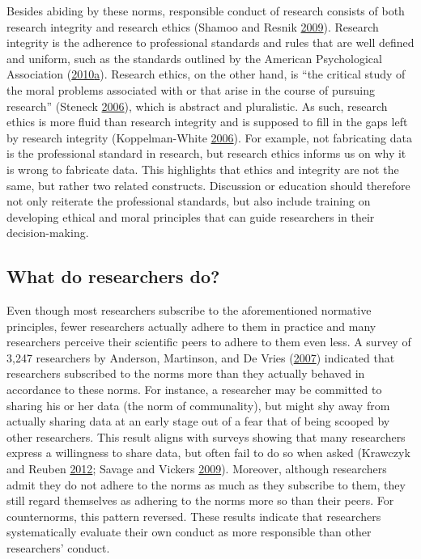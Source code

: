 \documentclass[a5paper]{book}
\begin{document}
Besides abiding by these norms, responsible conduct of research consists
of both research integrity and research ethics (Shamoo and Resnik
\protect\hyperlink{ref-isbn:9780199376025}{2009}). Research integrity is
the adherence to professional standards and rules that are well defined
and uniform, such as the standards outlined by the American
Psychological Association
(\protect\hyperlink{ref-apa2010}{2010}\protect\hyperlink{ref-apa2010}{a}).
Research ethics, on the other hand, is \enquote{the critical study of
the moral problems associated with or that arise in the course of
pursuing research} (Steneck
\protect\hyperlink{ref-doi:10.1007ux2fpl00022268}{2006}), which is
abstract and pluralistic. As such, research ethics is more fluid than
research integrity and is supposed to fill in the gaps left by research
integrity (Koppelman-White
\protect\hyperlink{ref-doi:10.1080ux2f08989620600848611}{2006}). For
example, not fabricating data is the professional standard in research,
but research ethics informs us on why it is wrong to fabricate data.
This highlights that ethics and integrity are not the same, but rather
two related constructs. Discussion or education should therefore not
only reiterate the professional standards, but also include training on
developing ethical and moral principles that can guide researchers in
their decision-making.

\subsection{What do researchers do?}\label{what-do-researchers-do}

Even though most researchers subscribe to the aforementioned normative
principles, fewer researchers actually adhere to them in practice and
many researchers perceive their scientific peers to adhere to them even
less. A survey of 3,247 researchers by Anderson, Martinson, and De Vries
(\protect\hyperlink{ref-doi:10.1525ux2fjer.2007.2.4.3}{2007}) indicated
that researchers subscribed to the norms more than they actually behaved
in accordance to these norms. For instance, a researcher may be
committed to sharing his or her data (the norm of communality), but
might shy away from actually sharing data at an early stage out of a
fear that of being scooped by other researchers. This result aligns with
surveys showing that many researchers express a willingness to share
data, but often fail to do so when asked (Krawczyk and Reuben
\protect\hyperlink{ref-doi:10.1080ux2f08989621.2012.678688}{2012};
Savage and Vickers
\protect\hyperlink{ref-doi:10.1371ux2fjournal.pone.0007078}{2009}).
Moreover, although researchers admit they do not adhere to the norms as
much as they subscribe to them, they still regard themselves as adhering
to the norms more so than their peers. For counternorms, this pattern
reversed. These results indicate that researchers systematically
evaluate their own conduct as more responsible than other researchers'
conduct.
\end{document}
